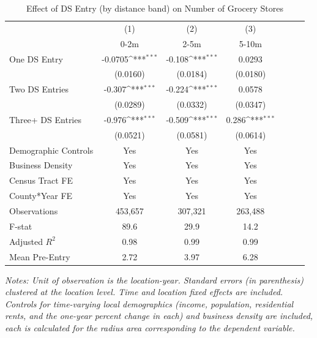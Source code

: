 \def\sym#1{\ifmmode^{#1}\else\(^{#1}\)\fi}
\begin{table}[ht]
\caption{Effect of DS Entry (by distance band) on Number of Grocery Stores}
\label{RF_exit_table_distance}
\centering
\begin{threeparttable}
\begin{tabular}{l*{6}{c}}
\hline\hline
                &\multicolumn{1}{c}{(1)}         &\multicolumn{1}{c}{(2)}         &\multicolumn{1}{c}{(3)}    \\
                &     0-2m         &     2-5m         &    5-10m              \\
\hline
One DS Entry &  -0.0705\sym{***}&   -0.108\sym{***}&   0.0293         \\
                & (0.0160)         & (0.0184)         & (0.0180)         \\
Two DS Entries &   -0.307\sym{***}&   -0.224\sym{***}&   0.0578         \\
                & (0.0289)         & (0.0332)         & (0.0347)         \\
Three+ DS Entries &   -0.976\sym{***}&   -0.509\sym{***}&    0.286\sym{***}\\
                & (0.0521)         & (0.0581)         & (0.0614)         \\

 \addlinespace               
Demographic Controls                 &   Yes    &   Yes     &    Yes      \\
Business Density                 &   Yes    &   Yes     &    Yes      \\
Census Tract FE                   &   Yes    &   Yes     &    Yes        \\
County*Year FE                   &   Yes    &   Yes     &    Yes        \\


\hline
Observations    &  453,657         &  307,321         &  263,488         \\
F-stat          &     89.6         &     29.9         &     14.2         \\
Adjusted \(R^{2}\)&     0.98         &     0.99         &     0.99         \\
Mean Pre-Entry  &     2.72         &     3.97         &     6.28         \\
\hline\hline
\end{tabular}
\begin{tablenotes}[flushleft]
\small 
\item \textit{Notes: Unit of observation is the location-year. Standard errors (in parenthesis) clustered at the location level. Time and location fixed effects are included. Controls for time-varying local demographics (income, population, residential rents, and the one-year percent change in each) and business density are included, each is calculated for the radius area corresponding to the dependent variable.}
\end{tablenotes}
\end{threeparttable}
\end{table}